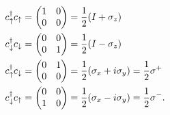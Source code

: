 \begin{align}
		c^{\dagger}_{\uparrow}c_{\uparrow} &= \begin{pmatrix}
		1 & 0\\0&0
	\end{pmatrix} = \frac{1}{2}(I + \sigma_z) \\ 
	c^{\dagger}_{\downarrow}c_{\downarrow} &= \begin{pmatrix}
	0 & 0\\0&1
	\end{pmatrix} = \frac{1}{2}(I-\sigma_z) \\
c^{\dagger}_{\uparrow}c_{\downarrow} &= \begin{pmatrix}
	0 & 1\\0&0
\end{pmatrix} = \frac{1}{2}(\sigma_x+i\sigma_y) = \frac{1}{2}\sigma^+\\
c^{\dagger}_{\downarrow}c_{\uparrow} &= \begin{pmatrix}
	0 & 0\\1&0
\end{pmatrix} = \frac{1}{2}(\sigma_x-i\sigma_y) = \frac{1}{2}\sigma^-.
\end{align}

